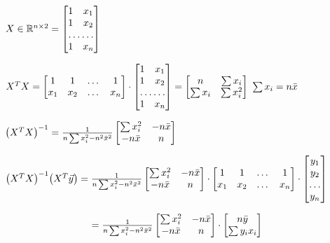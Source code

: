 \documentclass[12pt]{article}
\begin{document}
\begin{enumerate}
$ X \in \mathbb{R}^{n \times 2} = \begin{bmatrix}
    1       & x_{1} \\
    1      & x_{2}  \\
    \hdotsfor{2} \\
    1       & x_{n} 
\end{bmatrix}$ \newline 

$ X^T X =     \begin{bmatrix}
    1   & 1 & \dots & 1 \\
    x_1 & x_2 & \dots & x_n
    \end{bmatrix} 
    \cdot 
\begin{bmatrix}
    1       & x_{1} \\
    1      & x_{2}  \\
    \hdotsfor{2} \\
    1       & x_{n} 
    \end{bmatrix}
    = 
        \begin{bmatrix}
    n  & \sum x_i  \\
    \sum x_i & \sum x_i^2
    \end{bmatrix}$ \newline 
$ \sum x_i = n\bar{x}$ \newline 

$\big( X^T X\big)^{-1} = \frac{1}{n\sum x_i^2 -n^2 \bar{x}^2} \begin{bmatrix}
\sum x_i^2 & -n\bar{x} \\
-n\bar{x} & n 
\end{bmatrix}$ \newline 

$ \big( X^T X\big)^{-1} \big( X^T \vec{y} \big) =  \frac{1}{n\sum x_i^2 -n^2 \bar{x}^2} \begin{bmatrix}
\sum x_i^2 & -n\bar{x} \\
-n\bar{x} & n 
\end{bmatrix} 
\cdot 
\begin{bmatrix}
    1   & 1 & \dots & 1 \\
    x_1 & x_2 & \dots & x_n
    \end{bmatrix} 
\cdot
\begin{bmatrix}
 y_1 \\
 y_2 \\
 \dots \\
 y_n
 \end{bmatrix}$ \newline 
 
 $ \hspace*{3.1cm} = \frac{1}{n\sum x_i^2 -n^2 \xbar^2} \begin{bmatrix}
\sum x_i^2 & -n\xbar \\
-n\xbar & n 
\end{bmatrix}
\cdot 
\begin{bmatrix}
n\ybar \\
\sum y_i x_i
\end{bmatrix}$ \newline 


\end{enumerate}
\end{document}
